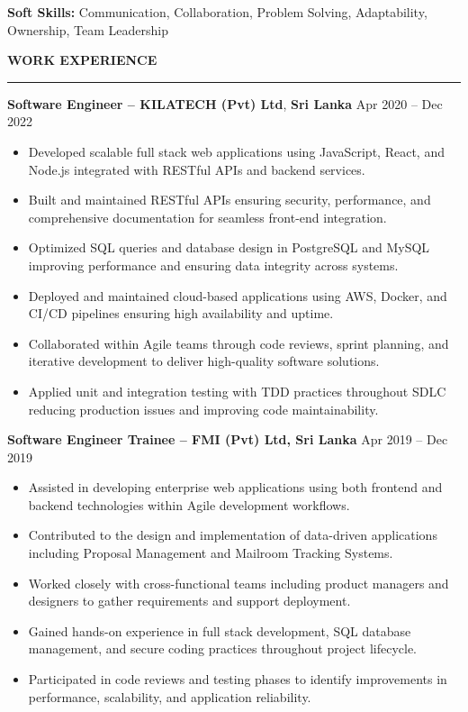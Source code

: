 \documentclass[10pt,letterpaper]{article}
\begin{document}
\textbf{Soft Skills:} Communication, Collaboration, Problem Solving, Adaptability, Ownership, Team Leadership

\vspace{8pt}

\textbf{WORK EXPERIENCE}\\[-8pt]
\noindent\rule{\textwidth}{1pt}

\vspace{-2pt}

\textbf{Software Engineer -- KILATECH (Pvt) Ltd}, \textbf{Sri Lanka} \hfill Apr 2020 -- Dec 2022

\vspace{-1pt}

\begin{itemize}
\item Developed scalable full stack web applications using JavaScript, React, and Node.js integrated with RESTful APIs and backend services.
\item Built and maintained RESTful APIs ensuring security, performance, and comprehensive documentation for seamless front-end integration.
\item Optimized SQL queries and database design in PostgreSQL and MySQL improving performance and ensuring data integrity across systems.
\item Deployed and maintained cloud-based applications using AWS, Docker, and CI/CD pipelines ensuring high availability and uptime.
\item Collaborated within Agile teams through code reviews, sprint planning, and iterative development to deliver high-quality software solutions.
\item Applied unit and integration testing with TDD practices throughout SDLC reducing production issues and improving code maintainability.
\end{itemize}

\textbf{Software Engineer Trainee -- FMI (Pvt) Ltd, Sri Lanka} \hfill Apr 2019 -- Dec 2019

\vspace{-1pt}

\begin{itemize}
\item Assisted in developing enterprise web applications using both frontend and backend technologies within Agile development workflows.
\item Contributed to the design and implementation of data-driven applications including Proposal Management and Mailroom Tracking Systems.
\item Worked closely with cross-functional teams including product managers and designers to gather requirements and support deployment.
\item Gained hands-on experience in full stack development, SQL database management, and secure coding practices throughout project lifecycle.
\item Participated in code reviews and testing phases to identify improvements in performance, scalability, and application reliability.
\end{itemize}
\end{document}

